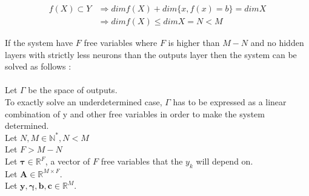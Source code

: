 \documentclass{article}
\begin{document}
\begin{equation*}
    \begin{split}
    f(X) \subset Y & \Rightarrow dim f(X) + dim \{x, f(x) = b\}  = dim X \\
    & \Rightarrow dim f(X) \leq dim X = N <  M
    \end{split}
\end{equation*}

If the system have $F$ free variables where $F$ is higher than $M-N$ and no hidden layers 
with strictly less neurons than the outputs layer then the system can be solved as follows :
\\
\\
Let $\Gamma$ be the space of outputs.\\ To exactly solve an underdetermined case, $\Gamma$ has to be expressed as a linear combination of
y and other free variables in order to make the system determined.  \\
Let $ N,M \in \mathbb{N^{*}},N<M$
\\ Let $ F > M-N$
\\ Let $\boldsymbol{\tau} \in \mathbb{R}^F$, a vector of $F$ free variables that the $y_{k}$ will depend on.
\\ Let $\textbf{A} \in \mathbb{R}^{M \times F}$.
\\ Let $\textbf{y},\boldsymbol{\gamma},\textbf{b},\textbf{c} \in \mathbb{R}^{M}$.
\end{document}
